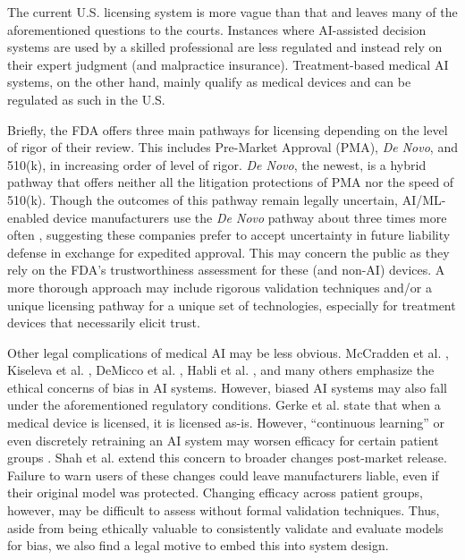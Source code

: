 \documentclass[authoryear,preprint,12pt]{elsarticle}
\begin{document}
The current U.S. licensing system is more vague than that and leaves many of the
aforementioned questions to the courts. Instances where AI-assisted decision
systems are used by a skilled professional are less regulated and instead rely
on their expert judgment (and malpractice insurance). Treatment-based medical
AI systems, on the other hand, mainly qualify as medical devices and can be
regulated as such in the U.S. 

Briefly, the FDA offers three main pathways for licensing depending on the level
of rigor of their review. This includes Pre-Market Approval (PMA), \textit{De
Novo}, and 510(k), in increasing order of level of rigor. \textit{De Novo}, the
newest, is a hybrid pathway that offers neither all the litigation protections
of PMA nor the speed of 510(k). Though the outcomes of this pathway remain
legally uncertain, AI/ML-enabled device manufacturers use the \textit{De Novo}
pathway about three times more often \cite{gerkeNewCaseLaw2025}, suggesting
these companies prefer to accept uncertainty in future liability defense in
exchange for expedited approval. This may concern the public as they rely on the
FDA's trustworthiness assessment for these (and non-AI) devices. A more thorough
approach may include rigorous validation techniques and/or a unique licensing
pathway for a unique set of technologies, especially for treatment devices that
necessarily elicit trust.

Other legal complications of medical AI may be less obvious. McCradden et al.
\cite{mccraddenPatientSafetyQuality2020}, Kiseleva et al.
\cite{kiselevaAreYouAIS2021}, DeMicco et al.
\cite{demiccoRoboticsAIHealthcare2024}, Habli et al.
\cite{habliArtificialIntelligenceHealth2020}, and many others emphasize the
ethical concerns of bias in AI systems. However, biased AI systems may also fall
under the aforementioned regulatory conditions. Gerke et al.
\cite{gerkeNewCaseLaw2025} state that when a medical device is licensed, it is
licensed as-is. However, ``continuous learning'' or even discretely retraining
an AI system may worsen efficacy for certain patient groups
\cite{gerkeNewCaseLaw2025}. Shah et al.
\cite{shahRegulatoryLegalConsiderations2025} extend this concern to broader
changes post-market release. Failure to warn users of these changes could leave
manufacturers liable, even if their original model was protected. Changing
efficacy across patient groups, however, may be difficult to assess without
formal validation techniques. Thus, aside from being ethically valuable to
consistently validate and evaluate models for bias, we also find a legal motive
to embed this into system design.
\end{document}
